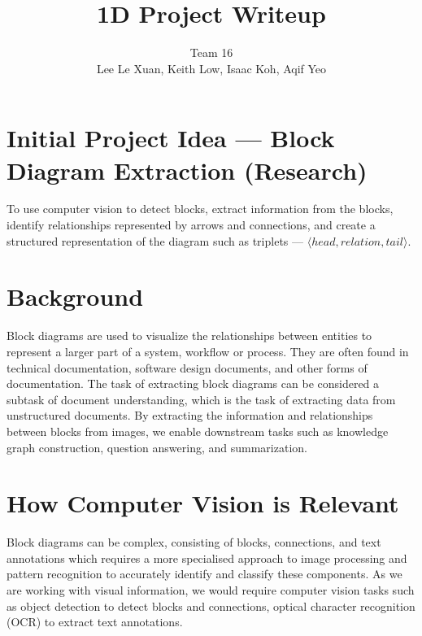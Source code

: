 \documentclass{article}
\title{1D Project Writeup}
\author{Team 16 \\ Lee Le Xuan, Keith Low, Isaac Koh, Aqif Yeo}
\date{}
\begin{document}
\maketitle

\section*{Initial Project Idea --- Block Diagram Extraction (Research)}
To use computer vision to detect blocks, extract information from the blocks, identify relationships represented by arrows and connections, and create a structured representation of the diagram such as triplets --- $\langle \mathit{head, relation, tail} \rangle$.

\section*{Background}
Block diagrams are used to visualize the relationships between entities to represent a larger part of a system, workflow or process. They are often found in technical documentation, software design documents, and other forms of documentation. The task of extracting block diagrams can be considered a subtask of document understanding, which is the task of extracting data from unstructured documents. By extracting the information and relationships between blocks from images, we enable downstream tasks such as knowledge graph construction, question answering, and summarization.

\section*{How Computer Vision is Relevant}
Block diagrams can be complex, consisting of blocks, connections, and text annotations which requires a more specialised approach to image processing and pattern recognition to accurately identify and classify these components. As we are working with visual information, we would require computer vision tasks such as object detection to detect blocks and connections, optical character recognition (OCR) to extract text annotations. 
\end{document}
